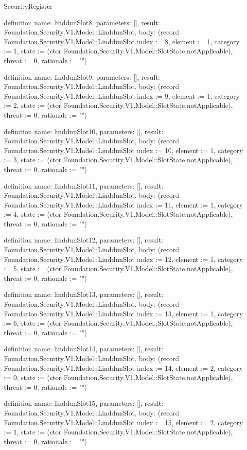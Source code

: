 \begin{lexlean}{SecurityRegister}
\begin{semanticmodule}
definition{
  name: linddunSlot8,
  parameters: [],
  result: Foundation.Security.V1.Model::LinddunSlot,
  body: (record Foundation.Security.V1.Model::LinddunSlot {index := 8, element := 1, category := 1, state := (ctor Foundation.Security.V1.Model::SlotState.notApplicable), threat := 0, rationale := ""})
}

definition{
  name: linddunSlot9,
  parameters: [],
  result: Foundation.Security.V1.Model::LinddunSlot,
  body: (record Foundation.Security.V1.Model::LinddunSlot {index := 9, element := 1, category := 2, state := (ctor Foundation.Security.V1.Model::SlotState.notApplicable), threat := 0, rationale := ""})
}

definition{
  name: linddunSlot10,
  parameters: [],
  result: Foundation.Security.V1.Model::LinddunSlot,
  body: (record Foundation.Security.V1.Model::LinddunSlot {index := 10, element := 1, category := 3, state := (ctor Foundation.Security.V1.Model::SlotState.notApplicable), threat := 0, rationale := ""})
}

definition{
  name: linddunSlot11,
  parameters: [],
  result: Foundation.Security.V1.Model::LinddunSlot,
  body: (record Foundation.Security.V1.Model::LinddunSlot {index := 11, element := 1, category := 4, state := (ctor Foundation.Security.V1.Model::SlotState.notApplicable), threat := 0, rationale := ""})
}

definition{
  name: linddunSlot12,
  parameters: [],
  result: Foundation.Security.V1.Model::LinddunSlot,
  body: (record Foundation.Security.V1.Model::LinddunSlot {index := 12, element := 1, category := 5, state := (ctor Foundation.Security.V1.Model::SlotState.notApplicable), threat := 0, rationale := ""})
}

definition{
  name: linddunSlot13,
  parameters: [],
  result: Foundation.Security.V1.Model::LinddunSlot,
  body: (record Foundation.Security.V1.Model::LinddunSlot {index := 13, element := 1, category := 6, state := (ctor Foundation.Security.V1.Model::SlotState.notApplicable), threat := 0, rationale := ""})
}

definition{
  name: linddunSlot14,
  parameters: [],
  result: Foundation.Security.V1.Model::LinddunSlot,
  body: (record Foundation.Security.V1.Model::LinddunSlot {index := 14, element := 2, category := 0, state := (ctor Foundation.Security.V1.Model::SlotState.notApplicable), threat := 0, rationale := ""})
}

definition{
  name: linddunSlot15,
  parameters: [],
  result: Foundation.Security.V1.Model::LinddunSlot,
  body: (record Foundation.Security.V1.Model::LinddunSlot {index := 15, element := 2, category := 1, state := (ctor Foundation.Security.V1.Model::SlotState.notApplicable), threat := 0, rationale := ""})
}


\end{semanticmodule}
\end{lexlean}
